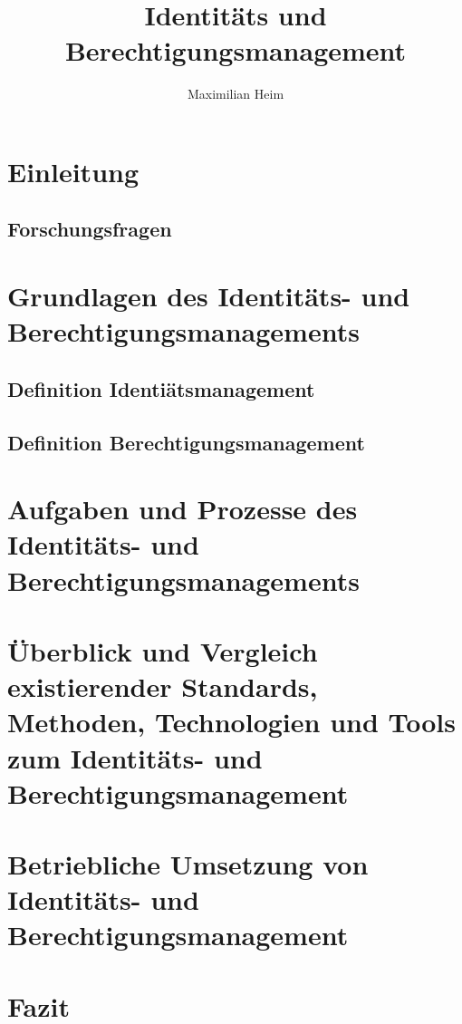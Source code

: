 \documentclass[10pt]{article}
\author{Maximilian Heim}
\title{Identitäts und Berechtigungsmanagement}
\begin{document}
\maketitle
\newpage
\tableofcontents
\newpage
\section{Einleitung}
\subsection{Forschungsfragen}
\section{Grundlagen des Identitäts- und Berechtigungsmanagements}
\subsection{Definition Identiätsmanagement}
\subsection{Definition Berechtigungsmanagement}
\section{Aufgaben und Prozesse des Identitäts- und Berechtigungsmanagements}
\section{Überblick und Vergleich existierender Standards, Methoden, Technologien und Tools zum Identitäts- und Berechtigungsmanagement}
\section{Betriebliche Umsetzung von Identitäts- und Berechtigungsmanagement}
\section{Fazit}
\end{document}
